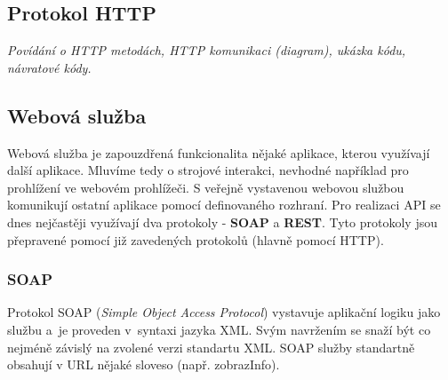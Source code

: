 \subsection{Protokol HTTP}

\textit{Povídání o HTTP metodách, HTTP komunikaci (diagram), ukázka kódu, návratové kódy.}


\subsection{Webová služba}

\indent

Webová služba je zapouzdřená funkcionalita nějaké aplikace, kterou využívají další aplikace.
Mluvíme tedy o strojové interakci, nevhodné například pro prohlížení ve webovém prohlížeči.
S veřejně vystavenou webovou službou komunikují ostatní aplikace pomocí definovaného rozhraní.
Pro realizaci API se dnes nejčastěji využívají dva protokoly - \textbf{SOAP} a \textbf{REST}.
Tyto protokoly jsou přepravené pomocí již zavedených protokolů (hlavně pomocí HTTP).

\subsubsection*{SOAP}

\indent

Protokol SOAP (\textit{Simple Object Access Protocol}) vystavuje aplikační logiku jako službu
a~je proveden v~syntaxi jazyka XML. Svým navržením se snaží
být co nejméně závislý na zvolené verzi standartu XML.
SOAP služby standartně obsahují v URL nějaké sloveso (např. zobrazInfo). 